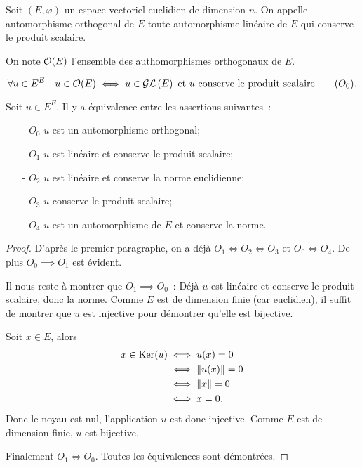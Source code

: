 \begin{defdef}
  Soit $(E,\varphi)$ un espace vectoriel euclidien de dimension $n$. On appelle automorphisme orthogonal de $E$ toute automorphisme linéaire de $E$ qui conserve le produit scalaire.

  On note $\mathcal{O}\!\left(E\right)$ l'ensemble des authomorphismes orthogonaux de $E$.
\end{defdef}
  \begin{equation}
    \label{eq:O0}
    \forall u \in E^E \quad u \in \mathcal{O}\!\left(E\right) \iff u \in \mathcal{GL}\left(E\right) \text{~et~} u \text{~conserve le produit scalaire} \tag{$O_0$}.
  \end{equation}
\begin{theo}
  Soit $u \in E^E$. Il y a équivalence entre les assertions suivantes~:
  \begin{enumerate}
  \item[- $O_0$] $u$ est un automorphisme orthogonal;
  \item[- $O_1$] $u$ est linéaire et conserve le produit scalaire;
  \item[- $O_2$] $u$ est linéaire et conserve la norme euclidienne;
  \item[- $O_3$] $u$ conserve le produit scalaire;
  \item[- $O_4$] $u$ est un automorphisme de $E$ et conserve la norme.
  \end{enumerate}
\end{theo}
\begin{proof}
  D'après le premier paragraphe, on a déjà $O_1 \iff O_2 \iff O_3$ et $O_0 \iff O_4$. De plus $O_0 \implies O_1$ est évident. 

  Il nous reste à montrer que $O_1 \implies O_0$~: Déjà $u$ est linéaire et conserve le produit scalaire, donc la norme. Comme $E$ est de dimension finie (car euclidien), il suffit de montrer que $u$ est injective pour démontrer qu'elle est bijective.

Soit $x \in E$, alors
\begin{align}
  x \in \operatorname{Ker}(u) &\iff u(x)=0 \\
  &\iff \left\lVert u(x)\right\rVert = 0 \\
  &\iff \left\lVert x\right\rVert=0 \\
  &\iff x=0.
\end{align}
Donc le noyau est nul, l'application $u$ est donc injective. Comme $E$ est de dimension finie, $u$ est bijective.

Finalement $O_1 \iff O_0$. Toutes les équivalences sont démontrées.
\end{proof}

